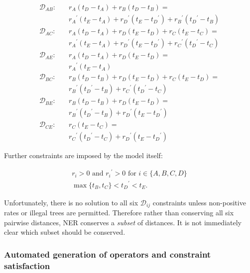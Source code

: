 \documentclass[10pt,letterpaper]{article}
\begin{document}
\begin{align}
	\mathcal{D}_{AB}: \quad & r_A  (t_D - t_A) + r_B  (t_D - t_B) = \nonumber \\
					 & {r_A}^\prime  (t_E - t_A) + {r_D}^\prime  (t_E - {t_D}^\prime) + {r_B}^\prime ({t_D}^\prime - t_B) \\
	\mathcal{D}_{AC}: \quad & r_A  (t_D - t_A) + r_D  (t_E - t_D) + r_C  (t_E - t_C) = \nonumber \\
				 	  & {r_A}^\prime  (t_E - t_A) + {r_D}^\prime  (t_E - {t_D}^\prime) + {r_C}^\prime ({t_D}^\prime - t_C) \\
 	\mathcal{D}_{AE}: \quad & r_A  (t_D - t_A) + r_D  (t_E - t_D)= \nonumber \\
					  & {r_A}^\prime  (t_E - t_A) \\
  	\mathcal{D}_{BC}: \quad & r_B  (t_D - t_B) + r_D  (t_E - t_D) + r_C  (t_E - t_D)= \nonumber \\
					  & {r_B}^\prime ({t_D}^\prime - t_B) + {r_C}^\prime ({t_D}^\prime - t_C) \\
   	\mathcal{D}_{BE}: \quad & r_B  (t_D - t_B) + r_D  (t_E - t_D)= \nonumber \\
					  & {r_B}^\prime ({t_D}^\prime - t_B) + {r_D}^\prime (t_E - {t_D}^\prime) \\
	\mathcal{D}_{CE}: \quad & r_C  (t_E - t_C)= \nonumber \\
					  & {r_C}^\prime ({t_D}^\prime - t_C) + {r_D}^\prime (t_E - {t_D}^\prime) 
\end{align}


Further constraints are imposed by the model itself:


\begin{align}
	r_i > 0 \text{ and } {r_i}^\prime > 0 \text { for } i \in \{A,B,C,D\} \\
	\max\{t_B, t_C \} < {t_D}^\prime < t_E.
\end{align}



Unfortunately, there is no solution to all six $\mathcal{D}_{ij}$ constraints unless non-positive rates or illegal trees are permitted.
 Therefore rather than conserving all six pairwise distances, NER conserves a \textit{subset} of distances. It is not immediately clear which subset should be conserved. 


\subsubsection*{Automated generation of operators and constraint satisfaction}
\end{document}
